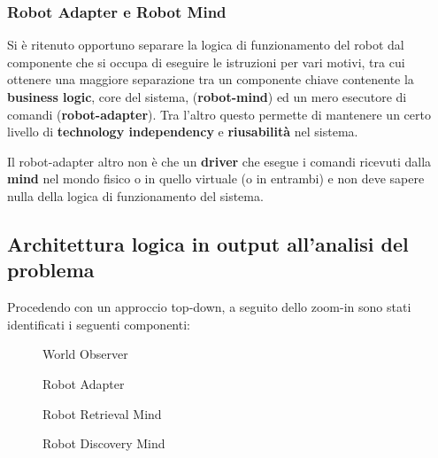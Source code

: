 \subsubsection{Robot Adapter e Robot Mind}

Si è ritenuto opportuno separare la logica di funzionamento del robot dal componente che si occupa di eseguire le istruzioni per vari motivi,
tra cui ottenere una maggiore separazione tra un componente chiave contenente la \textbf{business logic}, core del sistema, (\textbf{robot-mind}) ed un mero esecutore di comandi (\textbf{robot-adapter}).
Tra l'altro questo permette di mantenere un certo livello di \textbf{technology independency} e \textbf{riusabilità} nel sistema.

Il robot-adapter altro non è che un \textbf{driver} che esegue i comandi ricevuti dalla \textbf{mind} nel mondo fisico o in quello virtuale (o in entrambi) e non deve sapere nulla della logica di funzionamento del sistema.

\subsection{Architettura logica in output all'analisi del problema}

Procedendo con un approccio top-down, a seguito dello zoom-in sono stati identificati i seguenti componenti:

\begin{figure}[H]
  \centering
  \caption{World Observer}%
  \label{fig:sp1:prob:worldobserver}
\end{figure}

\begin{figure}[H]
  \centering
  \caption{Robot Adapter}%
  \label{fig:sp1:prob:robotadapter}
\end{figure}

\begin{figure}[H]
  \centering
  \caption{Robot Retrieval Mind}%
  \label{fig:sp1:prob:robotretrieval}
\end{figure}

\begin{figure}[H]
  \centering
  \caption{Robot Discovery Mind}%
  \label{fig:sp1:prob:robotdiscovery}
\end{figure}

